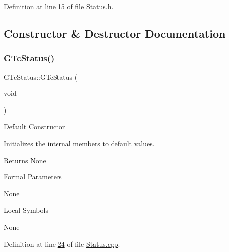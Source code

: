 Definition at line \mbox{\hyperlink{_status_8h_source_l00015}{15}} of file \mbox{\hyperlink{_status_8h_source}{Status.\+h}}.



\subsection{Constructor \& Destructor Documentation}
\mbox{\label{class_g_n_common_1_1_g_n_notification_1_1_g_tc_status_a5531fe8477d9e8db2a947ab469f63bac}} 
\subsubsection{\texorpdfstring{G\+Tc\+Status()}{GTcStatus()}\hspace{0.1cm}{\footnotesize\ttfamily [1/2]}}
{\footnotesize\ttfamily G\+Tc\+Status\+::\+G\+Tc\+Status (\begin{DoxyParamCaption}\item[{void}]{ }\end{DoxyParamCaption})}

Default Constructor

Initializes the internal members to default values.

\begin{DoxyReturn}{Returns}
None
\end{DoxyReturn}
\begin{DoxyParagraph}{Formal Parameters}

\begin{DoxyPre}{\ttfamily  None }\end{DoxyPre}

\end{DoxyParagraph}
\begin{DoxyParagraph}{Local Symbols}

\begin{DoxyPre}{\ttfamily  None }\end{DoxyPre}
 
\end{DoxyParagraph}


Definition at line \mbox{\hyperlink{_status_8cpp_source_l00024}{24}} of file \mbox{\hyperlink{_status_8cpp_source}{Status.\+cpp}}.

